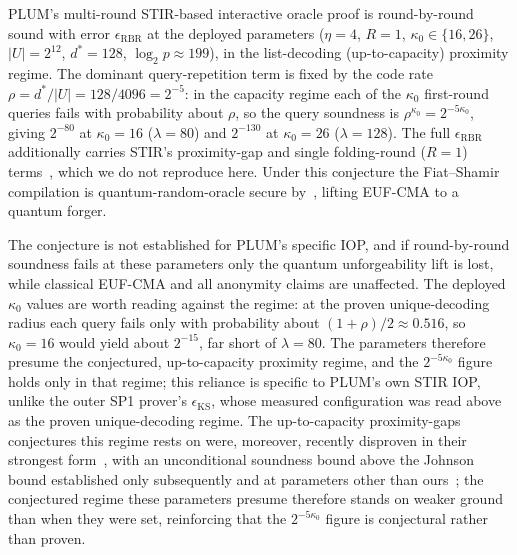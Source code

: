 \begin{conjecture}\label{conj:rbr-stir}
    PLUM's multi-round STIR-based interactive oracle proof is round-by-round sound with error $\epsilon_{\mathrm{RBR}}$ at the deployed parameters ($\eta=4$, $R=1$, $\kappa_0\in\{16,26\}$, $|U|=2^{12}$, $d^*=128$, $\log_2 p\approx199$), in the list-decoding (up-to-capacity) proximity regime. The dominant query-repetition term is fixed by the code rate $\rho=d^*/|U|=128/4096=2^{-5}$: in the capacity regime each of the $\kappa_0$ first-round queries fails with probability about $\rho$, so the query soundness is $\rho^{\kappa_0}=2^{-5\kappa_0}$, giving $2^{-80}$ at $\kappa_0=16$ ($\lambda=80$) and $2^{-130}$ at $\kappa_0=26$ ($\lambda=128$). The full $\epsilon_{\mathrm{RBR}}$ additionally carries STIR's proximity-gap and single folding-round ($R=1$) terms~\cite{cryptoeprint:2024/390}, which we do not reproduce here. Under this conjecture the Fiat--Shamir compilation is quantum-random-oracle secure by~\cite{cryptoeprint:2019/834,cryptoeprint:2025/2166}, lifting EUF-CMA to a quantum forger.
\end{conjecture}

The conjecture is not established for PLUM's specific IOP, and if round-by-round soundness fails at these parameters only the quantum unforgeability lift is lost, while classical EUF-CMA and all anonymity claims are unaffected. The deployed $\kappa_0$ values are worth reading against the regime: at the proven unique-decoding radius each query fails only with probability about $(1+\rho)/2\approx0.516$, so $\kappa_0=16$ would yield about $2^{-15}$, far short of $\lambda=80$. The parameters therefore presume the conjectured, up-to-capacity proximity regime, and the $2^{-5\kappa_0}$ figure holds only in that regime; this reliance is specific to PLUM's own STIR IOP, unlike the outer SP1 prover's $\epsilon_{\mathrm{KS}}$, whose measured configuration was read above as the proven unique-decoding regime. The up-to-capacity proximity-gaps conjectures this regime rests on were, moreover, recently disproven in their strongest form~\cite{crites2025proximitygaps}, with an unconditional soundness bound above the Johnson bound established only subsequently and at parameters other than ours~\cite{chai2026frijohnson}; the conjectured regime these parameters presume therefore stands on weaker ground than when they were set, reinforcing that the $2^{-5\kappa_0}$ figure is conjectural rather than proven.

